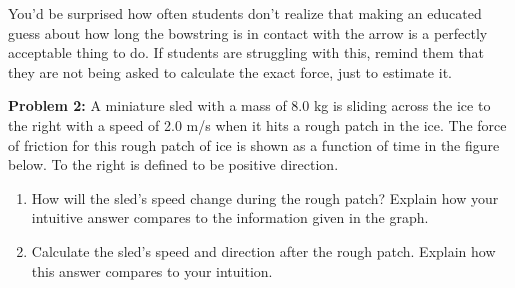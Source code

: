 \begin{tutorialbox}[title = Student Issue: Guessing Values]
You'd be surprised how often students don't realize that making an educated guess 
about how long the bowstring is in contact with the arrow is a perfectly acceptable
thing to do.  If students are struggling with this, remind them that they are not being
asked to calculate the exact force, just to estimate it.
\end{tutorialbox}

\newpage
\noindent
\textbf{Problem 2:}  A miniature sled with a mass of 8.0 kg is sliding across the 
ice to the right with a speed of 2.0 m/s when it hits a rough patch in the ice. 
The force of friction for this rough patch of ice is shown as a function of time 
in the figure below. To the right is defined to be positive direction.

\begin{enumerate}[label=(\alph*)]
    \item How will the sled’s speed change during the rough patch? 
    Explain how your intuitive answer compares to the information given in the graph.
    \item Calculate the sled’s speed and direction after the rough patch. 
    Explain how this answer compares to your intuition.
\end{enumerate}
    
\begin{center}
\end{center}

